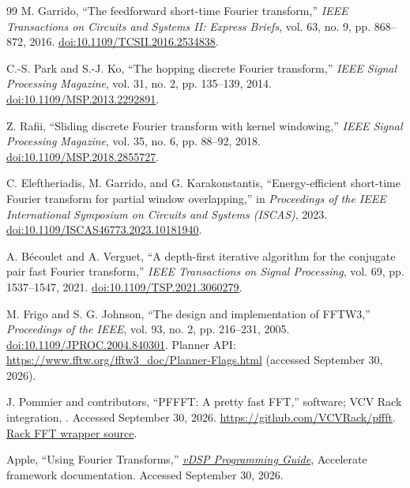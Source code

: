\begin{thebibliography}{99}
M. Garrido, ``The feedforward short-time Fourier transform,''
\emph{IEEE Transactions on Circuits and Systems II: Express Briefs},
vol. 63, no. 9, pp. 868--872, 2016.
\href{https://doi.org/10.1109/TCSII.2016.2534838}{doi:10.1109/TCSII.2016.2534838}.

C.-S. Park and S.-J. Ko, ``The hopping discrete Fourier transform,''
\emph{IEEE Signal Processing Magazine}, vol. 31, no. 2, pp. 135--139, 2014.
\href{https://doi.org/10.1109/MSP.2013.2292891}{doi:10.1109/MSP.2013.2292891}.

Z. Rafii, ``Sliding discrete Fourier transform with kernel windowing,''
\emph{IEEE Signal Processing Magazine}, vol. 35, no. 6, pp. 88--92, 2018.
\href{https://doi.org/10.1109/MSP.2018.2855727}{doi:10.1109/MSP.2018.2855727}.

C. Eleftheriadis, M. Garrido, and G. Karakonstantis, ``Energy-efficient
short-time Fourier transform for partial window overlapping,'' in
\emph{Proceedings of the IEEE International Symposium on Circuits and
Systems (ISCAS)}, 2023.
\href{https://doi.org/10.1109/ISCAS46773.2023.10181940}{doi:10.1109/ISCAS46773.2023.10181940}.

A. B\'ecoulet and A. Verguet, ``A depth-first iterative algorithm for the
conjugate pair fast Fourier transform,'' \emph{IEEE Transactions on Signal
Processing}, vol. 69, pp. 1537--1547, 2021.
\href{https://doi.org/10.1109/TSP.2021.3060279}{doi:10.1109/TSP.2021.3060279}.

M. Frigo and S. G. Johnson, ``The design and implementation of FFTW3,''
\emph{Proceedings of the IEEE}, vol. 93, no. 2, pp. 216--231, 2005.
\href{https://doi.org/10.1109/JPROC.2004.840301}{doi:10.1109/JPROC.2004.840301}.
Planner API: \url{https://www.fftw.org/fftw3_doc/Planner-Flags.html}
(accessed September 30, 2026).

J. Pommier and contributors, ``PFFFT: A pretty fast FFT,'' software;
VCV Rack integration, . Accessed September 30, 2026.
\url{https://github.com/VCVRack/pffft}.
\href{https://github.com/VCVRack/Rack/blob/v2/include/dsp/fft.hpp}{Rack FFT wrapper source}.

Apple, ``Using Fourier Transforms,''
\href{https://developer.apple.com/library/archive/documentation/Performance/Conceptual/vDSP_Programming_Guide/UsingFourierTransforms/UsingFourierTransforms.html}{\emph{vDSP Programming Guide}},
Accelerate framework documentation. Accessed September 30, 2026.


\end{thebibliography}
